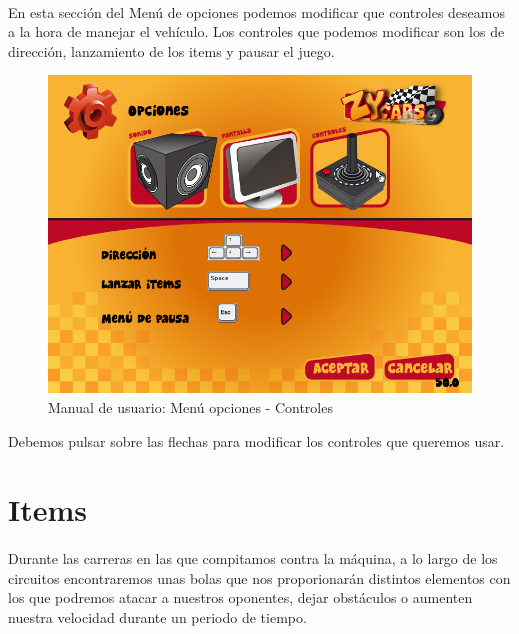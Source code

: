 \paragraph{}
En esta sección del Menú de opciones podemos modificar que controles deseamos a la hora de manejar el vehículo. Los 
controles que podemos modificar son los de dirección, lanzamiento de los items y pausar el juego.

\begin{figure}[H]
  \label{menu_controles}
  \begin{center}
    \includegraphics[scale=0.4]{imagenes/capturas/menuopcionescontroles.png}
  \end{center}
 \caption{Manual de usuario: Menú opciones - Controles}
\end{figure}

Debemos pulsar sobre las flechas para modificar los controles que queremos usar.

\section{Items}

\paragraph{}
Durante las carreras en las que compitamos contra la máquina, a lo largo de los circuitos encontraremos unas bolas que nos
proporionarán distintos elementos con los que podremos atacar a nuestros oponentes, dejar obstáculos o aumenten nuestra velocidad
durante un periodo de tiempo.

